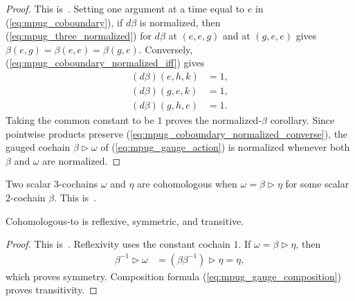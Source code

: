 \begin{proof}\leanok
    This is~\cite[``Normalization under a gauge'']{QICLean2026Blueprint}.
    Setting one argument at a time equal to $e$ in
    (\ref{eq:mpug_coboundary}), if $d\beta$ is normalized, then
    (\ref{eq:mpug_three_normalized}) for $d\beta$ at $(e,e,g)$ and at
    $(g,e,e)$ gives $\beta(e,g)=\beta(e,e)=\beta(g,e)$. Conversely,
    (\ref{eq:mpug_coboundary_normalized_iff}) gives
    \begin{align}
        (d\beta)(e,h,k) & =1, \\
        (d\beta)(g,e,k) & =1, \\
        (d\beta)(g,h,e) & =1.
        \label{eq:mpug_coboundary_normalized_converse}
    \end{align}
    Taking the common constant to be $1$ proves the normalized-$\beta$
    corollary. Since pointwise products preserve
    (\ref{eq:mpug_coboundary_normalized_converse}), the gauged cochain
    $\beta\mathbin{\triangleright}\omega$ of (\ref{eq:mpug_gauge_action}) is
    normalized whenever both $\beta$ and $\omega$ are normalized.
\end{proof}

\begin{definition}
    \label{def:mpug_cohomologous_to}
    \leanok
    Two scalar $3$-cochains $\omega$ and $\eta$ are cohomologous when
    $\omega=\beta\mathbin{\triangleright}\eta$ for some scalar
    $2$-cochain $\beta$.
    This is~\cite[``Cohomologous scalar three-cochains'']{QICLean2026Blueprint}.
\end{definition}

\begin{lemma}
    \label{thm:mpug_cohomologous_to_equivalence}
    \leanok
    Cohomologous-to is reflexive, symmetric, and transitive.
\end{lemma}

\begin{proof}\leanok
    This is~\cite[``Cohomologous-to is an equivalence
        relation'']{QICLean2026Blueprint}.
    Reflexivity uses the constant cochain $1$. If $\omega=
        \beta\mathbin{\triangleright}\eta$, then
    \begin{align}
        \beta^{-1}\mathbin{\triangleright}\omega
         & =(\beta\beta^{-1})\mathbin{\triangleright}\eta
        =\eta,
    \end{align}
    which proves symmetry. Composition formula
    (\ref{eq:mpug_gauge_composition}) proves transitivity.
\end{proof}

